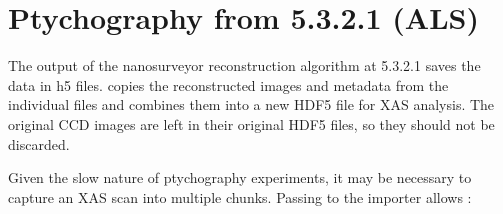 \documentclass[letterpaper,10pt,english]{sphinxmanual}
\begin{document}
\section{Ptychography from 5.3.2.1 (ALS)}
\label{\detokenize{importing:ptychography-from-5-3-2-1-als}}
The output of the nanosurveyor reconstruction algorithm at 5.3.2.1
saves the data in h5
files. 
copies the reconstructed images and metadata from the individual files
and combines them into a new HDF5 file for XAS analysis. The original
CCD images are left in their original HDF5 files, so they should not
be discarded.

\begin{sphinxVerbatim}[commandchars=\\\{\}]
   

\end{sphinxVerbatim}

Given the slow nature of ptychography experiments, it may be necessary
to capture an XAS scan into multiple chunks. Passing 
to the importer allows :
\end{document}
